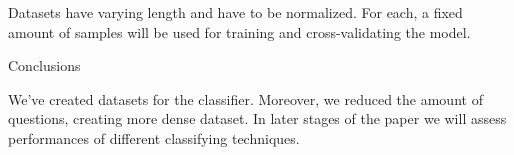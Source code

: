 \documentclass[11pt]{article}
\begin{document}
Datasets have varying length and have to be normalized. For each, a
fixed amount of samples will be used for training and cross-validating
the model.

{Conclusions}\label{conclusions}

We've created datasets for the classifier. Moreover, we reduced the
amount of questions, creating more dense dataset. In later stages of the
paper we will assess performances of different classifying techniques.


    
    
    
    
\end{document}
